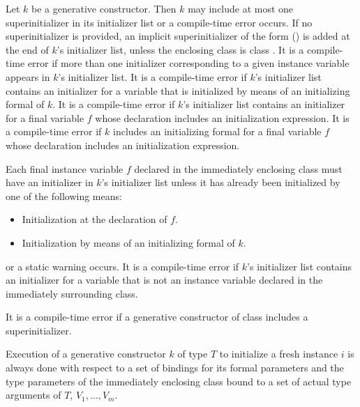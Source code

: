\documentclass{article}
\begin{document}
\LMHash{}
Let $k$ be a generative constructor.
Then $k$ may include at most one superinitializer in its initializer list or a compile-time error occurs.
If no superinitializer is provided, an implicit superinitializer of the form \SUPER{}() is added at the end of $k$'s initializer list,
unless the enclosing class is class .
It is a compile-time error if more than one initializer corresponding to a given instance variable appears in $k$'s initializer list.
It is a compile-time error if $k$'s initializer list contains an initializer for a variable that is initialized by means of an initializing formal of $k$.
It is a compile-time error if $k$'s initializer list contains an initializer for a final variable $f$ whose declaration includes an initialization expression.
It is a compile-time error if $k$ includes an initializing formal for a final variable $f$ whose declaration includes an initialization expression.

\LMHash{}
Each final instance variable $f$ declared in the immediately enclosing class must have an initializer in $k$'s initializer list unless it has already been initialized by one of the following means:
\begin{itemize}
\item Initialization at the declaration of $f$.
\item Initialization by means of an initializing formal of $k$.
\end{itemize}

or a static warning occurs.
It is a compile-time error if $k$'s initializer list contains an initializer for a variable that is not an instance variable declared in the immediately surrounding class.


\LMHash{}
It is a compile-time error if a generative constructor of class  includes a superinitializer.

\LMHash{}
Execution of a generative constructor $k$ of type $T$ to initialize a fresh instance $i$
is always done with respect to a set of bindings for its formal parameters
and the type parameters of the immediately enclosing class bound to a set of actual type arguments of $T$, $V_1, \ldots, V_m$.

\end{document}
